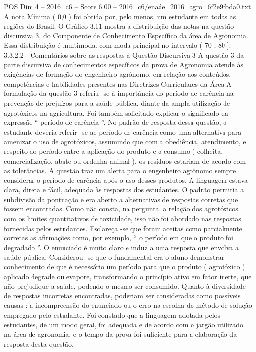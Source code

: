 \begin{textsample}{POS Dim 4 – 2016\_c6 – Score 6.00 – 2016\_c6/enade\_2016\_agro\_6f2e9fbda0.txt}
A nota Mínima ( 0,0 ) foi obtida por, pelo menos, um estudante em todas as regiões do Brasil.
O Gráfico 3.11 mostra a distribuição das notas na questão discursiva 3, do Componente de Conhecimento Específico da área de Agronomia.
Essa distribuição é multimodal com moda principal no intervalo ( 70 ; 80 ]. 3.3.2.2 - Comentários sobre as respostas à Questão Discursiva 3 A questão 3 da parte discursiva de conhecimentos específicos da prova de Agronomia atende às exigências de formação do engenheiro agrônomo, em relação aos conteúdos, competências e habilidades presentes nas Diretrizes Curriculares da Área A formulação da questão 3 referiu -se à importância do período de carência na prevenção de prejuízos para a saúde pública, diante da ampla utilização de agrotóxicos na agricultura.
Foi também solicitado explicar o significado da expressão “ período de carência ”.
No padrão de resposta dessa questão, o estudante deveria referir -se ao período de carência como uma alternativa para amenizar o uso de agrotóxicos, assumindo que com a obediência, atendimento, e respeito ao período entre a aplicação do produto e o consumo ( colheita, comercialização, abate ou ordenha animal ), os resíduos estariam de acordo com as tolerâncias.
A questão traz um alerta para o engenheiro agrônomo sempre considerar o período de carência após o uso desses produtos.
A linguagem estava clara, direta e fácil, adequada às respostas dos estudantes.
O padrão permitia a subdivisão da pontuação e era aberto a alternativas de respostas corretas que fossem encontradas.
Como não consta, na pergunta, a relação dos agrotóxicos com os limites quantitativos de toxicidade, isso não foi abordado nas respostas fornecidas pelos estudantes.
Esclareça -se que foram aceitas como parcialmente corretas as afirmações como, por exemplo, “ o período em que o produto foi degradado ”.
O enunciado é muito claro e induz a uma resposta que envolva a saúde pública.
Considerou -se que o fundamental era o aluno demonstrar conhecimento de que é necessário um período para que o produto ( agrotóxico ) aplicado degrade ou evapore, transformando o princípio ativo em fator inerte, que não prejudique a saúde, podendo o mesmo ser consumido.
Quanto à diversidade de respostas incorretas encontradas, poderiam ser consideradas como possíveis causas : a incompreensão do enunciado ou o erro na escolha do método de solução empregado pelo estudante.
Foi constado que a linguagem adotada pelos estudantes, de um modo geral, foi adequada e de acordo com o jargão utilizado na área de agronomia, e o tempo da prova foi suficiente para a elaboração da resposta desta questão.

\end{textsample}
